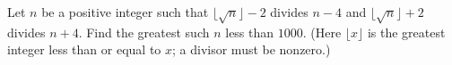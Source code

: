 Let $n$ be a positive integer such that $\lfloor\sqrt n\rfloor-2$ divides $n-4$ and $\lfloor\sqrt n\rfloor+2$ divides $n+4$. Find the greatest such $n$ less than $1000$. (Here $\lfloor x\rfloor$ is the greatest integer less than or equal to $x$; a divisor must be nonzero.)
